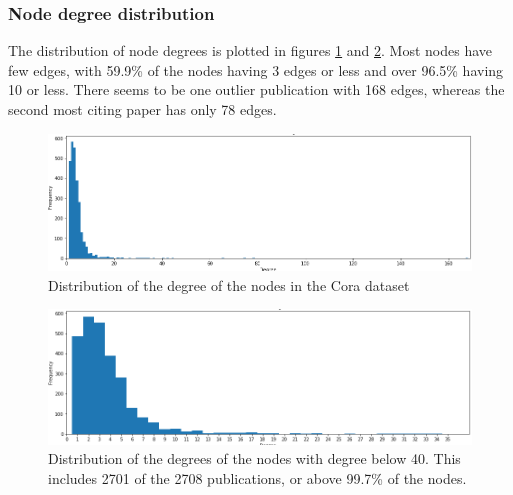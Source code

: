 \documentclass[12pt]{article}
\theoremstyle{definition}
\begin{document}
\subsubsection{Node degree distribution}
The distribution of node degrees is plotted in figures \ref{fig/node_degrees} and \ref{fig/node_degrees_truncated}. Most nodes have few edges, with 59.9\% of the nodes having 3 edges or less and over 96.5\% having 10 or less. There seems to be one outlier publication with 168 edges, whereas the second most citing paper has only 78 edges.

\begin{figure}[h]
	\includegraphics[width=1.0\textwidth]{node_degrees}
	\centering
	\caption{Distribution of the degree of the nodes in the Cora dataset}
	\label{fig/node_degrees}
\end{figure}

\begin{figure}[h]
	\includegraphics[width=1.0\textwidth]{node_degrees_truncated}
	\centering
	\caption{Distribution of the degrees of the nodes with degree below 40. This includes 2701 of the 2708 publications, or above 99.7\% of the nodes.}
	\label{fig/node_degrees_truncated}
\end{figure}
\end{document}
